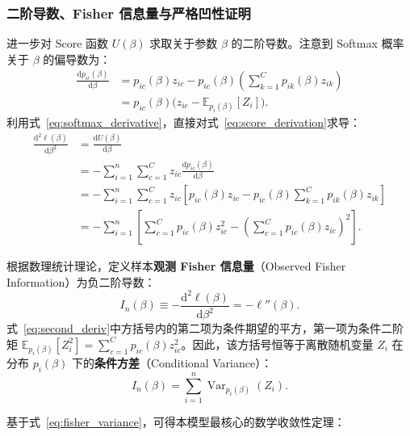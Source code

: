 \subsubsection{二阶导数、Fisher 信息量与严格凹性证明}

进一步对 Score 函数 $U(\beta)$ 求取关于参数 $\beta$ 的二阶导数。注意到 Softmax 概率关于 $\beta$ 的偏导数为：
\begin{equation}\label{eq:softmax_derivative}
\begin{split}
\frac{\mathrm{d} p_{ic}(\beta)}{\mathrm{d}\beta} &= p_{ic}(\beta) z_{ic} - p_{ic}(\beta) \left( \sum_{k=1}^C p_{ik}(\beta) z_{ik} \right) \\
&= p_{ic}(\beta) \big( z_{ic} - \mathbb{E}_{p_i(\beta)}[Z_i] \big).
\end{split}
\end{equation}
利用式~\eqref{eq:softmax_derivative}，直接对式~\eqref{eq:score_derivation}求导：
\begin{align}
\frac{\mathrm{d}^2\ell(\beta)}{\mathrm{d}\beta^2} &= \frac{\mathrm{d} U(\beta)}{\mathrm{d}\beta} \nonumber\\
&= - \sum_{i=1}^n \sum_{c=1}^C z_{ic} \frac{\mathrm{d} p_{ic}(\beta)}{\mathrm{d}\beta} \nonumber\\
&= - \sum_{i=1}^n \sum_{c=1}^C z_{ic} \left[ p_{ic}(\beta) z_{ic} - p_{ic}(\beta) \sum_{k=1}^C p_{ik}(\beta) z_{ik} \right] \nonumber\\
&= - \sum_{i=1}^n \left[ \sum_{c=1}^C p_{ic}(\beta) z_{ic}^2 - \left( \sum_{c=1}^C p_{ic}(\beta) z_{ic} \right)^2 \right]. \label{eq:second_deriv}
\end{align}

根据数理统计理论，定义样本\textbf{观测 Fisher 信息量}（Observed Fisher Information）为负二阶导数：
\begin{equation}\label{eq:fisher_defn}
I_n(\beta) \equiv - \frac{\mathrm{d}^2\ell(\beta)}{\mathrm{d}\beta^2} = - \ell''(\beta).
\end{equation}
式~\eqref{eq:second_deriv}中方括号内的第二项为条件期望的平方，第一项为条件二阶矩 $\mathbb{E}_{p_i(\beta)}[Z_i^2] = \sum_{c=1}^C p_{ic}(\beta) z_{ic}^2$。因此，该方括号恒等于离散随机变量 $Z_i$ 在分布 $p_i(\beta)$ 下的\textbf{条件方差}（Conditional Variance）：
\begin{equation}\label{eq:fisher_variance}
I_n(\beta) = \sum_{i=1}^n \operatorname{Var}_{p_i(\beta)}(Z_i).
\end{equation}

基于式~\eqref{eq:fisher_variance}，可得本模型最核心的数学收敛性定理：

